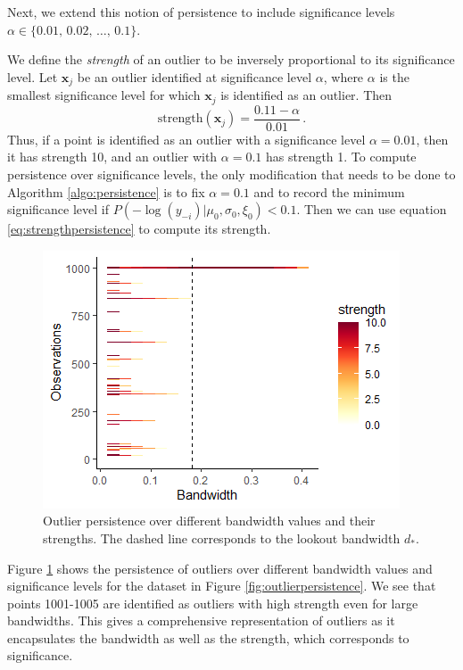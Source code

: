 \documentclass[11pt,a4paper,]{article}
\theoremstyle{definition}
\theoremstyle{definition}
\theoremstyle{definition}
\theoremstyle{remark}
\begin{document}
Next, we extend this notion of persistence to include significance levels \(\alpha \in \{0.01, \, 0.02, \, \ldots, \, 0.1 \}\).

We define the \emph{strength} of an outlier to be inversely proportional to its significance level. Let \(\bm{x}_j\) be an outlier identified at significance level \(\alpha\), where \(\alpha\) is the smallest significance level for which \(\bm{x}_j\) is identified as an outlier. Then
\begin{equation}\label{eq:strengthpersistence}
    \text{strength} \left( \bm{x}_j \right) = \frac{0.11 - \alpha}{0.01}  \, .
\end{equation}
Thus, if a point is identified as an outlier with a significance level \(\alpha = 0.01\), then it has strength 10, and an outlier with \(\alpha = 0.1\) has strength 1. To compute persistence over significance levels, the only modification that needs to be done to Algorithm \ref{algo:persistence} is to fix \(\alpha = 0.1\) and to record the minimum significance level if \(P\left(-\log(y_{-i})|\mu_0, \sigma_0, \xi_0 \right) < 0.1\).
Then we can use equation \eqref{eq:strengthpersistence} to compute its strength.

\begin{figure}[!ht]
    \centering
    \includegraphics[scale=0.8]{../Graphics/persistence_alpha.png}
    \caption{Outlier persistence over different bandwidth values and their strengths. The dashed line corresponds to the lookout bandwidth $d_*$.}
    \label{fig:outlierpersistence2}
\end{figure}

Figure \ref{fig:outlierpersistence2} shows the persistence of outliers over different bandwidth values and significance levels for the dataset in Figure \ref{fig:outlierpersistence}. We see that points 1001-1005 are identified as outliers with high strength even for large bandwidths. This gives a comprehensive representation of outliers as it encapsulates the bandwidth as well as the strength, which corresponds to significance.
\end{document}
